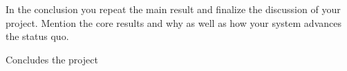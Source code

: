 \documentclass[a4paper,11pt,oneside]{report}
\begin{document}
In the conclusion you repeat the main result and finalize the discussion of
your project. Mention the core results and why as well as how your system
advances the status quo.

Concludes the project 
\cleardoublepage
{}
{}
\printbibliography

%
%
\end{document}
